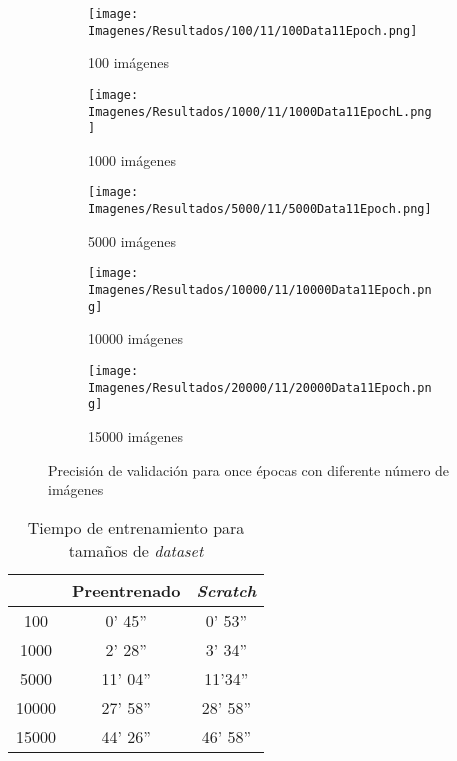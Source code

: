 \documentclass{report}
\begin{document}
\begin{figure}[H]
	 	\centering
	 	\begin{subfigure}[b]{0.45\linewidth}
	 	\centering
	 		\texttt{[image: Imagenes/Resultados/100/11/100Data11Epoch.png]}
	 		\caption{ 100 imágenes }
                    \label{fig:11Epo100D}
	 	\end{subfigure}
	 	\begin{subfigure}[b]{0.45\linewidth}
	 	\centering
	 		\texttt{[image: Imagenes/Resultados/1000/11/1000Data11EpochL.png]}
	 		\caption{ 1000 imágenes }
                    \label{fig:11Epo1000D}
	 	\end{subfigure}
	 	\centering
	 	\begin{subfigure}[b]{0.45\linewidth}
	 	\centering
	 		\texttt{[image: Imagenes/Resultados/5000/11/5000Data11Epoch.png]}
	 		\caption{ 5000 imágenes }
                    \label{fig:11Epo5000D}
	 	\end{subfigure}
	 	\centering
	 	\begin{subfigure}[b]{0.45\linewidth}
	 	\centering
	 		\texttt{[image: Imagenes/Resultados/10000/11/10000Data11Epoch.png]}
	 		\caption{ 10000 imágenes }
                    \label{fig:11Epo10000D}
	 	\end{subfigure}
            \begin{subfigure}[b]{0.45\linewidth}
	 	\centering
	 		\texttt{[image: Imagenes/Resultados/20000/11/20000Data11Epoch.png]}
	 		\caption{ 15000 imágenes }
                    \label{fig:11Epo2000D}
	 	\end{subfigure}
	 	\caption{ Precisión de validación para once épocas con diferente número de imágenes }
	 	\label{fig:11E}
\end{figure}

\begin{table}[H]
\centering
\begin{tabular}{|c|c|c|}
\hline
\cellcolor[HTML]{FFFFFF}{\color[HTML]{000000} Tamaño dataset} & Preentrenado & \textit{Scratch}\\ \hline
100    &  0' 45''  &  0' 53''  \\ \hline
1000   &  2' 28''  &  3' 34''  \\ \hline
5000   &  11' 04''  &  11'34''\\ \hline
10000  &  27' 58''  &  28' 58''  \\ \hline
15000  &  44' 26'' &  46' 58'' \\ \hline
\end{tabular}
\caption{Tiempo de entrenamiento para tamaños de \textit{dataset}}
\label{tab:tiempoPreVsScratch}
\end{table}
\end{document}
